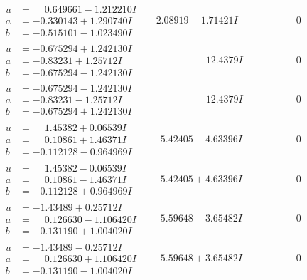 \documentclass[1p]{elsarticle_modified}
\theoremstyle{definition}
\begin{document}
$$\begin{array}{c|c|c}
\begin{aligned}
u &= \phantom{-}0.649661 - 1.212210 I \\
a &= -0.330143 + 1.290740 I \\
b &= -0.515101 - 1.023490 I\end{aligned}
 & -2.08919 - 1.71421 I & \phantom{-0.000000 } 0 \\ \hline\begin{aligned}
u &= -0.675294 + 1.242130 I \\
a &= -0.83231 + 1.25712 I \\
b &= -0.675294 - 1.242130 I\end{aligned}
 & \phantom{-0.000000 } -12.4379 I & \phantom{-0.000000 } 0 \\ \hline\begin{aligned}
u &= -0.675294 - 1.242130 I \\
a &= -0.83231 - 1.25712 I \\
b &= -0.675294 + 1.242130 I\end{aligned}
 & \phantom{-0.000000 -}12.4379 I & \phantom{-0.000000 } 0 \\ \hline\begin{aligned}
u &= \phantom{-}1.45382 + 0.06539 I \\
a &= \phantom{-}0.10861 + 1.46371 I \\
b &= -0.112128 - 0.964969 I\end{aligned}
 & \phantom{-}5.42405 - 4.63396 I & \phantom{-0.000000 } 0 \\ \hline\begin{aligned}
u &= \phantom{-}1.45382 - 0.06539 I \\
a &= \phantom{-}0.10861 - 1.46371 I \\
b &= -0.112128 + 0.964969 I\end{aligned}
 & \phantom{-}5.42405 + 4.63396 I & \phantom{-0.000000 } 0 \\ \hline\begin{aligned}
u &= -1.43489 + 0.25712 I \\
a &= \phantom{-}0.126630 - 1.106420 I \\
b &= -0.131190 + 1.004020 I\end{aligned}
 & \phantom{-}5.59648 - 3.65482 I & \phantom{-0.000000 } 0 \\ \hline\begin{aligned}
u &= -1.43489 - 0.25712 I \\
a &= \phantom{-}0.126630 + 1.106420 I \\
b &= -0.131190 - 1.004020 I\end{aligned}
 & \phantom{-}5.59648 + 3.65482 I & \phantom{-0.000000 } 0\\

\end{array}$$
\end{document}
